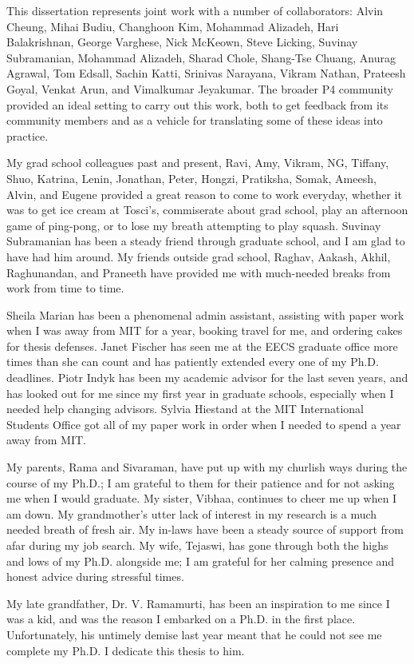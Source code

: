 This dissertation represents joint work with a number of collaborators: Alvin
Cheung, Mihai Budiu, Changhoon Kim, Mohammad Alizadeh, Hari Balakrishnan,
George Varghese, Nick McKeown, Steve Licking, Suvinay Subramanian, Mohammad
Alizadeh, Sharad Chole, Shang-Tse Chuang, Anurag Agrawal, Tom Edsall, Sachin
Katti, Srinivas Narayana, Vikram Nathan, Prateesh Goyal, Venkat Arun, and
Vimalkumar Jeyakumar. The broader P4 community provided an ideal setting to
carry out this work, both to get feedback from its community members and as a
vehicle for translating some of these ideas into practice. 

My grad school colleagues past and present, Ravi, Amy, Vikram, NG, Tiffany,
Shuo, Katrina, Lenin, Jonathan, Peter, Hongzi, Pratiksha, Somak, Ameesh, Alvin,
and Eugene provided a great reason to come to work everyday, whether it was to
get ice cream at Tosci's, commiserate about grad school, play an afternoon game
of ping-pong, or to lose my breath attempting to play squash.  Suvinay
Subramanian has been a steady friend through graduate school, and I am glad to
have had him around. My friends outside grad school, Raghav, Aakash, Akhil,
Raghunandan, and Praneeth have provided me with much-needed breaks from work
from time to time.

Sheila Marian has been a phenomenal admin assistant, assisting with paper work
when I was away from MIT for a year, booking travel for me, and ordering cakes
for thesis defenses. Janet Fischer has seen me at the EECS graduate office more
times than she can count and has patiently extended every one of my Ph.D.
deadlines. Piotr Indyk has been my academic advisor for the last seven years,
and has looked out for me since my first year in graduate schools, especially
when I needed help changing advisors. Sylvia Hiestand at the MIT International
Students Office got all of my paper work in order when I needed to spend a year
away from MIT.

My parents, Rama and Sivaraman, have put up with my churlish ways during the
course of my Ph.D.; I am grateful to them for their patience and for not asking
me when I would graduate. My sister, Vibhaa, continues to cheer me up when I am
down.  My grandmother's utter lack of interest in my research is a much needed
breath of fresh air. My in-laws have been a steady source of support from afar
during my job search. My wife, Tejaswi, has gone through both the highs and
lows of my Ph.D. alongside me; I am grateful for her calming presence and
honest advice during stressful times. 

My late grandfather, Dr. V. Ramamurti, has been an inspiration to me since I
was a kid, and was the reason I embarked on a Ph.D. in the first place.
Unfortunately, his untimely demise last year meant that he could not see me
complete my Ph.D. I dedicate this thesis to him.
